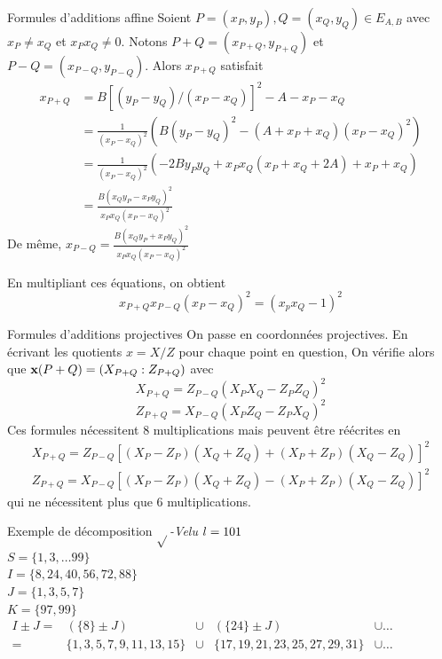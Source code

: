 \documentclass{beamer}
\begin{document}
\begin{frame}[noframenumbering]{Formules d'additions affine}\small
	Soient $P=(x_P,y_P), Q=(x_Q,y_Q) \in E_{A,B}$ avec $x_P \neq x_Q$ et $x_P x_Q \neq 0$.
	Notons $P+Q=(x_{P+Q},y_{P+Q})$ et $P-Q=(x_{P-Q},y_{P-Q})$. Alors $x_{P+Q}$ satisfait
	\[\begin{aligned}
		x_{P+Q}	&= B[(y_P - y_Q)/(x_P-x_Q)]^2 - A - x_P - x_Q \\
		&= \frac{1}{(x_P-x_Q)^2}( B(y_P - y_Q)^2 - (A + x_P + x_Q)(x_P - x_Q)^2) \\
		&= \frac{1}{(x_P-x_Q)^2}( -2B y_P y_Q + x_P x_Q (x_P + x_Q + 2A) + x_P + x_Q) \\
		&= \frac{B(x_Q y_P - x_P y_Q)^2}{x_P x_Q (x_P-x_Q)^2}
	\end{aligned}\]
	De même, $x_{P-Q} = \frac{B(x_Q y_P + x_P y_Q)^2}{x_P x_Q (x_P-x_Q)^2}$

	En multipliant ces équations, on obtient
	\[x_{P+Q} x_{P-Q} (x_P - x_Q)^2 = (x_p x_Q -1)^2\]
\end{frame}

\begin{frame}[noframenumbering]{Formules d'additions projectives}\small
	On passe en coordonnées projectives. En écrivant les quotients $x=X/Z$ pour chaque point en question,
	On vérifie alors que $\textbf{x}(P+Q)=(X_{P+Q}:Z_{P+Q})$ avec \[X_{P+Q} = Z_{P-Q}(X_P X_Q - Z_P Z_Q)^2\]\[Z_{P+Q} = X_{P-Q}(X_P Z_Q - Z_P X_Q)^2\]
	Ces formules nécessitent 8 multiplications mais peuvent être réécrites en
	\[\begin{array}{l}
		X_{P+Q} = Z_{P-Q}[(X_P-Z_P)(X_Q+Z_Q) + (X_P+Z_P)(X_Q-Z_Q)]^2\\
		Z_{P+Q} = X_{P-Q}[(X_P-Z_P)(X_Q+Z_Q) - (X_P+Z_P)(X_Q-Z_Q)]^2
	\end{array}\]
	qui ne nécessitent plus que 6 multiplications.
\end{frame}

\begin{frame}{Exemple de décomposition $\sqrt{}$\textit{-Velu}}
	$\mathnormal{l} = 101$\\
	$S = \lbrace 1, 3, \ldots 99 \rbrace$\\
	$I = \lbrace 8, 24, 40, 56, 72, 88 \rbrace $\\
	$J = \lbrace1, 3, 5, 7 \rbrace $\\
	$K = \lbrace 97, 99 \rbrace $\\

	$\begin{array}{rcccl}
		I\pm J =& (\{8\}\pm J) & \cup & (\{24\}\pm J) & \cup \ldots \\
		=&  {\scriptstyle \lbrace 1, 3, 5, 7, 9, 11, 13, 15\rbrace } & \cup &  {\scriptstyle \lbrace 17, 19, 21, 23, 25, 27, 29, 31\rbrace } & \cup \ldots
	\end{array}$
\end{frame}
\end{document}
